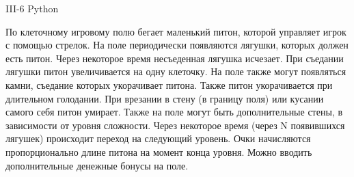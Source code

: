 
III-6 Python

По клеточному игровому полю бегает маленький питон, которой управляет игрок с
помощью стрелок. На поле периодически появляются лягушки, которых должен есть
питон. Через некоторое время несъеденная лягушка исчезает. При съедании
лягушки питон увеличивается на одну клеточку. На поле также могут появляться
камни, съедание которых укорачивает питона. Также питон укорачивается при
длительном голодании. При врезании в стену (в границу поля) или кусании самого
себя питон умирает. Также на поле могут быть дополнительные стены, в
зависимости от уровня сложности. Через некоторое время (через N появившихся
лягушек) происходит переход на следующий уровень. Очки начисляются
пропорционально длине питона на момент конца уровня. Можно вводить
дополнительные денежные бонусы на поле.

